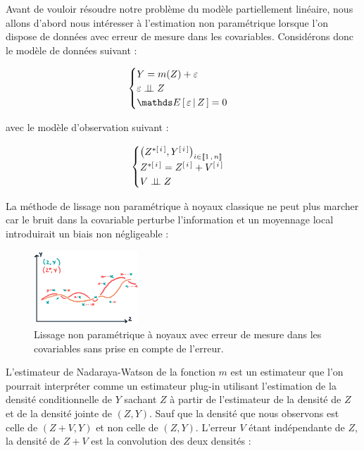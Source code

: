 Avant de vouloir résoudre notre problème du modèle partiellement linéaire, nous allons d'abord nous intéresser à l'estimation non paramétrique lorsque l'on dispose de données avec erreur de mesure dans les covariables. Considérons donc le modèle de données suivant :

\begin{equation}
    \begin{cases}
        Y = m(Z) + \varepsilon
        \\
        \varepsilon \indep Z
        \\
        \esperancesachant Z \varepsilon = 0
    \end{cases}
\end{equation}

avec le modèle d'observation suivant :

\begin{equation}
    \begin{cases}
        \left( Z^{*[\,i\,]}, {Y}^{[\,i\,]} \right)_{i \in \llbracket 1 \, , \, n \rrbracket}
        \\
        Z^{*[\,i\,]} = {Z}^{[\,i\,]} + {V}^{[\,i\,]} 
        \\
        V \perp \!\!\! \perp Z
    \end{cases}
\end{equation}

La méthode de lissage non paramétrique à noyaux classique ne peut plus marcher car le bruit dans la covariable perturbe l'information et un moyennage local introduirait un biais non négligeable :

\begin{figure}[H]
    \centering
    \includegraphics[width=0.35\textwidth]{Images/noyaux_erreur.jpeg}
    \caption{Lissage non paramétrique à noyaux avec erreur de mesure dans les covariables sans prise en compte de l'erreur.}
    \label{fig:noyaux_erreur}
\end{figure}

L'estimateur de Nadaraya-Watson de la fonction $m$ est un estimateur que l'on pourrait interpréter comme un estimateur plug-in utilisant l'estimation de la densité conditionnelle de $Y$ sachant $Z$ à partir de l'estimateur de la densité de $Z$ et de la densité jointe de $(Z,Y)$. Sauf que la densité que nous observons est celle de $(Z+V,Y)$ et non celle de $(Z,Y)$. L'erreur $V$ étant indépendante de $Z$, la densité de $Z+V$ est la convolution des deux densités :

